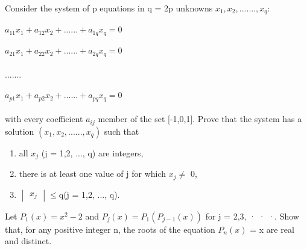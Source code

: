 

\item Consider the system of p equations in q = 2p unknowns $x_1, x_2,......., x_q :$\\
\\$a_{11}x_1 + a_{12}x_2 +......+ a_{1q}x_q = 0$\\
\\$a_{21}x_1 + a_{22}x_2 +......+ a_{2q}x_q = 0$\\
\\.......\\
\\$a_{p1}x_1 + a_{p2}x_2 +......+ a_{pq}x_q = 0$\\
\\with every coefficient $a_{ij}$ member of the set [-1,0,1]. Prove that the system
has a solution $(x_1, x_2,......, x_q)$ such that
\begin{enumerate}
\item all $x_j$ (j = 1,2, ..., q) are integers,
\item there is at least one value of j for which $x_j \neq$ 0,
\item $\begin{vmatrix} x_j \end{vmatrix} \leq$q(j = 1,2, ..., q).
\end{enumerate}

\item Let $P_1(x) = x^2 - 2$ and $P_j(x) = P_1(P_{j-1}(x))$ for j = 2,3, · · ·. Show that, for any positive integer n, the roots of the equation $P_n(x)$ = x are real and
distinct.


